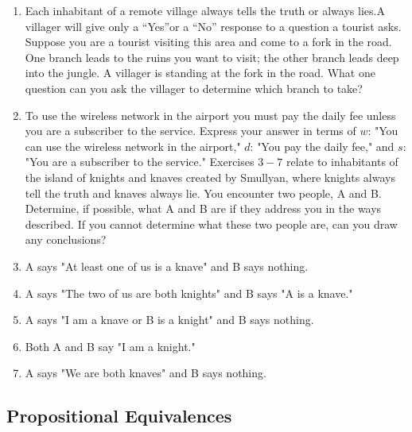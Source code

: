 \documentclass{sig-alternate-05-2015}
\begin{document}
\begin{enumerate}
\item Each inhabitant of a remote village always tells the truth
or always lies.A villager will give only a \textquotedblleft Yes\textquotedblright or a \textquotedblleft No\textquotedblright
response to a question a tourist asks. Suppose you are a
tourist visiting this area and come to a fork in the road.
One branch leads to the ruins you want to visit; the other
branch leads deep into the jungle. A villager is standing
at the fork in the road. What one question can you ask the
villager to determine which branch to take?

\item To use the wireless network in the airport you must pay
the daily fee unless you are a subscriber to the service.
Express your answer in terms of $w$: "You can use the wireless
network in the airport," $d$: "You pay the daily fee,"
and $s$: "You are a subscriber to the service."
\newline\newline
Exercises $3 - 7$ relate to inhabitants of the island of knights
and knaves created by Smullyan, where knights always tell
the truth and knaves always lie. You encounter two people,
A and B. Determine, if possible, what A and B are if they
address you in the ways described. If you cannot determine
what these two people are, can you draw any conclusions?

\item A says "At least one of us is a knave" and B says nothing.
\item A says "The two of us are both knights" and B says "A
is a knave."
\item A says "I am a knave or B is a knight" and B says nothing.
\item Both A and B say "I am a knight."
\item A says "We are both knaves" and B says nothing.

\end{enumerate}

\subsection{Propositional Equivalences}
\end{document}
